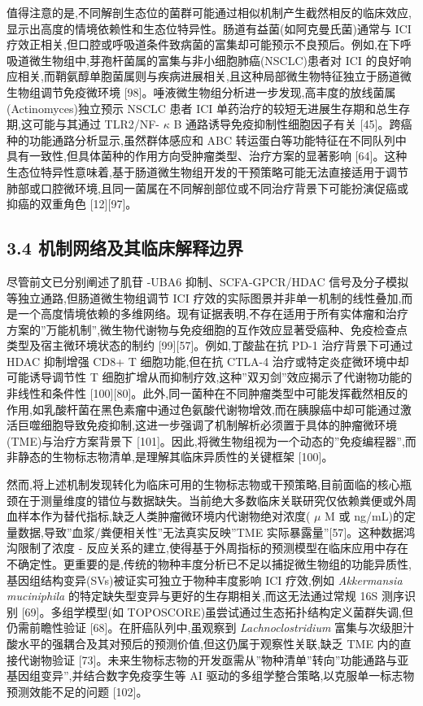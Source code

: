 值得注意的是,不同解剖生态位的菌群可能通过相似机制产生截然相反的临床效应,显示出高度的情境依赖性和生态位特异性。肠道有益菌(如阿克曼氏菌)通常与 ICI 疗效正相关,但口腔或呼吸道条件致病菌的富集却可能预示不良预后。例如,在下呼吸道微生物组中,芽孢杆菌属的富集与非小细胞肺癌(NSCLC)患者对 ICI 的良好响应相关,而鞘氨醇单胞菌属则与疾病进展相关,且这种局部微生物特征独立于肠道微生物组调节免疫微环境 {[}98{]}。唾液微生物组分析进一步发现,高丰度的放线菌属(Actinomyces)独立预示 NSCLC 患者 ICI 单药治疗的较短无进展生存期和总生存期,这可能与其通过 TLR2/NF- \(\kappa\) B 通路诱导免疫抑制性细胞因子有关 {[}45{]}。跨癌种的功能通路分析显示,虽然群体感应和 ABC 转运蛋白等功能特征在不同队列中具有一致性,但具体菌种的作用方向受肿瘤类型、治疗方案的显著影响 {[}64{]}。这种生态位特异性意味着,基于肠道微生物组开发的干预策略可能无法直接适用于调节肺部或口腔微环境,且同一菌属在不同解剖部位或不同治疗背景下可能扮演促癌或抑癌的双重角色 {[}12{]}{[}97{]}。

\subsection{3.4 机制网络及其临床解释边界}\label{ux673aux5236ux7f51ux7edcux53caux5176ux4e34ux5e8aux89e3ux91caux8fb9ux754c}

尽管前文已分别阐述了肌苷 -UBA6 抑制、SCFA-GPCR/HDAC 信号及分子模拟等独立通路,但肠道微生物组调节 ICI 疗效的实际图景并非单一机制的线性叠加,而是一个高度情境依赖的多维网络。现有证据表明,不存在适用于所有实体瘤和治疗方案的''万能机制'',微生物代谢物与免疫细胞的互作效应显著受癌种、免疫检查点类型及宿主微环境状态的制约 {[}99{]}{[}57{]}。例如,丁酸盐在抗 PD-1 治疗背景下可通过 HDAC 抑制增强 CD8+ T 细胞功能,但在抗 CTLA-4 治疗或特定炎症微环境中却可能诱导调节性 T 细胞扩增从而抑制疗效,这种''双刃剑''效应揭示了代谢物功能的非线性和条件性 {[}100{]}{[}80{]}。此外,同一菌种在不同肿瘤类型中可能发挥截然相反的作用,如乳酸杆菌在黑色素瘤中通过色氨酸代谢物增效,而在胰腺癌中却可能通过激活巨噬细胞导致免疫抑制,这进一步强调了机制解析必须置于具体的肿瘤微环境(TME)与治疗方案背景下 {[}101{]}。因此,将微生物组视为一个动态的''免疫编程器'',而非静态的生物标志物清单,是理解其临床异质性的关键框架 {[}100{]}。

然而,将上述机制发现转化为临床可用的生物标志物或干预策略,目前面临的核心瓶颈在于测量维度的错位与数据缺失。当前绝大多数临床关联研究仅依赖粪便或外周血样本作为替代指标,缺乏人类肿瘤微环境内代谢物绝对浓度( \(\mu\) M 或 ng/mL)的定量数据,导致''血浆/粪便相关性''无法真实反映''TME 实际暴露量''{[}57{]}。这种数据鸿沟限制了浓度 - 反应关系的建立,使得基于外周指标的预测模型在临床应用中存在不确定性。更重要的是,传统的物种丰度分析已不足以捕捉微生物组的功能异质性,基因组结构变异(SVs)被证实可独立于物种丰度影响 ICI 疗效,例如 \emph{Akkermansia muciniphila} 的特定缺失型变异与更好的生存期相关,而这无法通过常规 16S 测序识别 {[}69{]}。多组学模型(如 TOPOSCORE)虽尝试通过生态拓扑结构定义菌群失调,但仍需前瞻性验证 {[}68{]}。在肝癌队列中,虽观察到 \emph{Lachnoclostridium} 富集与次级胆汁酸水平的强耦合及其对预后的预测价值,但这仍属于观察性关联,缺乏 TME 内的直接代谢物验证 {[}73{]}。未来生物标志物的开发亟需从''物种清单''转向''功能通路与亚基因组变异'',并结合数字免疫孪生等 AI 驱动的多组学整合策略,以克服单一标志物预测效能不足的问题 {[}102{]}。

